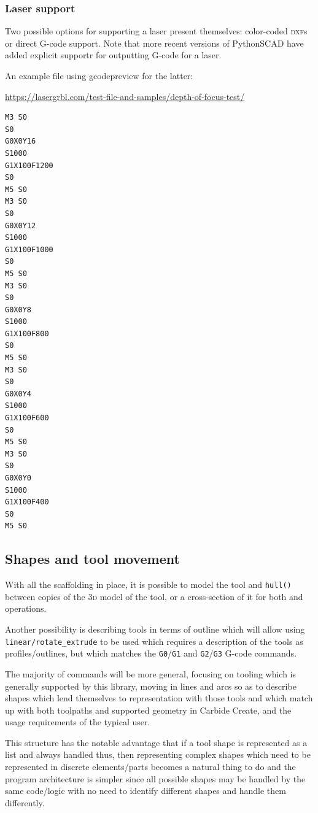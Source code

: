 \documentclass{ltxdoc}
\begin{document}
\subsubsection{Laser support}

Two possible options for supporting a laser present themselves: color-coded \textsc{dxf}s or direct G-code support. Note that more recent versions of PythonSCAD have added explicit supportr for outputting G-code for a laser. 

An example file using gcodepreview for the latter:

\url{https://lasergrbl.com/test-file-and-samples/depth-of-focus-test/}

\begin{verbatim}
M3 S0
S0 
G0X0Y16
S1000 
G1X100F1200
S0 
M5 S0
M3 S0
S0 
G0X0Y12
S1000 
G1X100F1000
S0 
M5 S0
M3 S0
S0 
G0X0Y8
S1000 
G1X100F800
S0 
M5 S0
M3 S0
S0 
G0X0Y4
S1000 
G1X100F600
S0 
M5 S0
M3 S0
S0 
G0X0Y0
S1000 
G1X100F400
S0 
M5 S0
\end{verbatim}

\subsection{Shapes and tool movement}

With all the scaffolding in place, it is possible to model the tool and \verb|hull()| between copies of the \textsc{3d} model of the tool, or a cross-section of it for both  and  operations.

Another possibility is describing tools in terms of outline which will allow using \verb|linear/rotate_extrude| to be used which requires a description of the tools as profiles/outlines, but which matches the \verb|G0|/\verb|G1| and \verb|G2|/\verb|G3| G-code commands.

The majority of commands will be more general, focusing on tooling which is generally supported by this library, moving in lines and arcs so as to describe shapes which lend themselves to representation with those tools and which match up with both toolpaths and supported geometry in Carbide Create, and the usage requirements of the typical user.

This structure has the notable advantage that if a tool shape is represented as a list and always handled thus, then representing complex shapes which need to be represented in discrete elements/parts becomes a natural thing to do and the program architecture is simpler since all possible shapes may be handled by the same code/logic with no need to identify different shapes and handle them differently.
\end{document}
